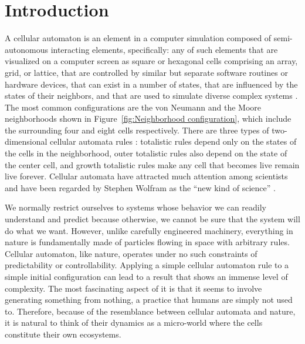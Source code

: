 \documentclass[12pt]{article}
\numberwithin{figure}{section} %
\begin{document}
\newpage
\thispagestyle{plain}
\listoffigures
\newpage
\thispagestyle{plain}
\listoftables
\newpage
\thispagestyle{plain}
\tableofcontents
\thispagestyle{plain}

\pagestyle{fancy}
\fancyhf{}
\rhead{\thepage}
\renewcommand{\headrulewidth}{0.4pt}
\newpage
\section{Introduction}
\label{Introduction}
A cellular automaton is an element in a computer simulation composed of semi-autonomous interacting elements, specifically: any of such elements that are visualized on a computer screen as square or hexagonal cells comprising an array, grid, or lattice, that are controlled by similar but separate software routines or hardware devices, that can exist in a number of states, that are influenced by the states of their neighbors, and that are used to simulate diverse complex systems \cite{MW}. The most common configurations are the von Neumann and the Moore neighborhoods shown in Figure~\ref{fig:Neighborhood configuration}, which include the surrounding four and eight cells respectively. There are three types of two-dimensional cellular automata rules \cite{A new kind of Science}: totalistic rules depend only on the states of the cells in the neighborhood, outer totalistic rules also depend on the state of the center cell, and growth totalistic rules make any cell that becomes live remain live forever. Cellular automata have attracted much attention among scientists and have been regarded by Stephen Wolfram as the “new kind of science” \cite{A new kind of Science}. 

We normally restrict ourselves to systems whose behavior we can readily understand and predict because otherwise, we cannot be sure that the system will do what we want. However, unlike carefully engineered machinery, everything in nature is fundamentally made of particles flowing in space with arbitrary rules. Cellular automaton, like nature, operates under no such constraints of predictability or controllability. Applying a simple cellular automaton rule to a simple initial configuration can lead to a result that shows an immense level of complexity. The most fascinating aspect of it is that it seems to involve generating something from nothing, a practice that humans are simply not used to. Therefore, because of the resemblance between cellular automata and nature, it is natural to think of their dynamics as a micro-world where the cells constitute their own ecosystems. 
\end{document}
